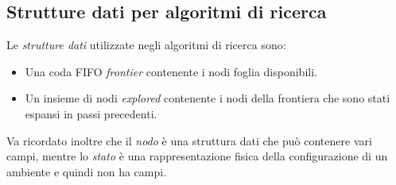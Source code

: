 \documentclass[11pt,oneside]{book}
\begin{document}
\subsection{Strutture dati per algoritmi di ricerca}
Le \textit{strutture dati} utilizzate negli algoritmi di ricerca sono:
\begin{itemize}
	\item Una coda FIFO \emph{frontier} contenente i nodi foglia disponibili.
	\item Un insieme di nodi \emph{explored} contenente i nodi della frontiera che sono stati espansi in passi precedenti.
\end{itemize}
Va ricordato inoltre che il \textit{nodo} è una struttura dati che può contenere vari campi, mentre lo \textit{stato} è una rappresentazione fisica della configurazione di un ambiente e quindi non ha campi.
\end{document}
